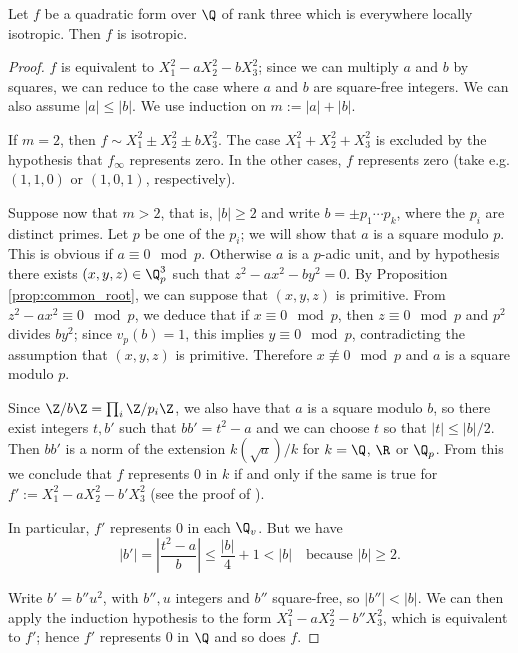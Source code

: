 \begin{lemma}\label{lem:isotr_of_rk_three}
	\leanok
	Let $f$ be a quadratic form over $\Q$ of rank three which is everywhere locally isotropic. Then $f$ is isotropic.
\end{lemma}
\begin{proof}
$f$ is equivalent to $X_1^2 - a X_2^2 - b X_3^2$; since we can multiply $a$ and $b$ by squares, we can reduce to the case where $a$ and $b$ are square-free integers. We can also assume $|a| \le |b|$. We use induction on $m := |a| + |b|$. 

If $m = 2$, then $f \sim X_1^2 \pm X_2^2 \pm b X_3^2$. The case $X_1^2 + X_2^2 + X_3^2$ is excluded by the hypothesis that $f_\infty$ represents zero. In the other cases, $f$ represents zero (take e.g. $(1, 1, 0)$ or $(1, 0, 1)$, respectively).

Suppose now that $m > 2$, that is, $|b| \ge 2$ and write $b = \pm p_1 \cdots p_k$, where the $p_i$ are distinct primes. Let $p$ be one of the $p_i$; we will show that $a$ is a square modulo $p$. This is obvious if $a \equiv 0 \mod p$. Otherwise $a$ is a $p$-adic unit, and by hypothesis there exists $(x, y, z) \in \Q_p^3$ such that $z^2 - ax^2 - by^2 = 0$. By Proposition \ref{prop:common_root}, we can suppose that $(x, y, z)$ is primitive.
From $z^2 - a x^2 \equiv 0 \mod p$, we deduce that if $x \equiv 0 \mod p$, then $z \equiv 0 \mod p$ and $p^2$ divides $by^2$; since $v_p(b) = 1$, this implies $y \equiv 0 \mod p$, contradicting the assumption that $(x, y, z)$ is primitive. Therefore $x \not\equiv 0 \mod p$ and $a$ is a square modulo $p$.

Since $\Z / b\Z = \prod_i \Z / p_i \Z$, we also have that $a$ is a square modulo $b$, so there exist integers $t, b'$ such that $bb' = t^2 - a$ and we can choose $t$ so that $|t| \le |b|/2$. Then $bb'$ is a norm of the extension $k(\sqrt{a})/k$ for $k = \Q$, $\R$ or $\Q_p$. From this we conclude that $f$ represents $0$ in $k$ if and only if the same is true for $f' := X_1^2 - a X_2^2 - b' X_3^2$ (see the proof of \cite[\S III.1.1, Proposition 1]{Ser73}).

In particular, $f'$ represents $0$ in each $\Q_v$. But we have 
\[ |b'| = \left | \frac{t^2 - a}{b} \right | \le \frac{|b|}{4} + 1 < |b| \quad \text{because } |b| \ge 2.  \]

Write $b' = b'' u^2$, with $b'', u$ integers and $b''$ square-free, so $|b''| < |b|$. We can then apply the induction hypothesis to the form $X_1^2 - a X_2^2 - b'' X_3^2$, which is equivalent to $f'$; hence $f'$ represents $0$ in $\Q$ and so does $f$.
\end{proof}

